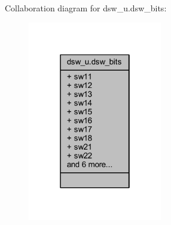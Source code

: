 Collaboration diagram for dsw\+\_\+u.\+dsw\+\_\+bits\+:
\nopagebreak
\begin{figure}[H]
\begin{center}
\leavevmode
\includegraphics[width=166pt]{d9/d39/a00257}
\end{center}
\end{figure}
